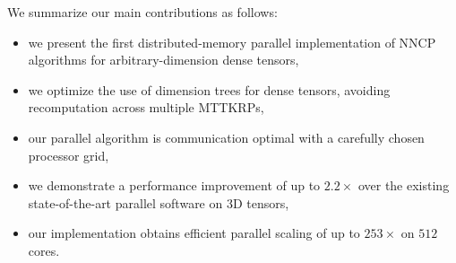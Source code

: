 We summarize our main contributions as follows:
\begin{itemize}
		\item we present the first distributed-memory parallel implementation of NNCP algorithms for arbitrary-dimension dense tensors,
		\item we optimize the use of dimension trees for dense tensors, avoiding recomputation across multiple MTTKRPs,
		\item our parallel algorithm is communication optimal with a carefully chosen processor grid,
		\item we demonstrate a performance improvement of up to $2.2\times$ over the existing state-of-the-art parallel software on 3D tensors,
		\item our implementation obtains efficient parallel scaling of up to $253\times$ on $512$ cores.
\end{itemize}